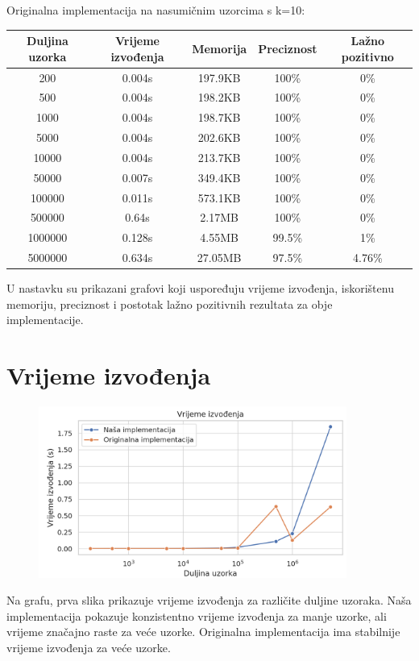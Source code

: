\documentclass[seminarskirad]{fer}
\begin{document}
Originalna implementacija na nasumičnim uzorcima s k=10:

\begin{center}
	\small
	\begin{tabular}{||c c c c c||} 
		\hline
		Duljina uzorka & Vrijeme izvođenja & Memorija & Preciznost & Lažno pozitivno \\ [0.5ex] 
		\hline\hline
		200 & 0.004s & 197.9KB & 100\% & 0\% \\ 
		\hline
		500 & 0.004s & 198.2KB & 100\% & 0\% \\
		\hline
		1000 & 0.004s & 198.7KB & 100\% & 0\% \\
		\hline
		5000 & 0.004s & 202.6KB & 100\% & 0\% \\
		\hline
		10000 & 0.004s & 213.7KB & 100\% & 0\% \\
		\hline
		50000 & 0.007s & 349.4KB & 100\% & 0\% \\ 
		\hline
		100000 & 0.011s & 573.1KB & 100\% & 0\% \\
		\hline
		500000 & 0.64s & 2.17MB & 100\% & 0\% \\
		\hline
		1000000 & 0.128s & 4.55MB & 99.5\% & 1\% \\
		\hline
		5000000 & 0.634s & 27.05MB & 97.5\% & 4.76\% \\ [1ex] 
		\hline
	\end{tabular}
\end{center}


U nastavku su prikazani grafovi koji uspoređuju vrijeme izvođenja, iskorištenu memoriju, preciznost i postotak lažno pozitivnih rezultata za obje implementacije.

\section{Vrijeme izvođenja}
\begin{figure}[h]
	\centering
	\includegraphics[width=0.9\textwidth]{images/nasumicni_rezultati_vrijeme.png}
	\label{fig:nasumicni_rezultati_vrijeme}
\end{figure}
Na grafu, prva slika prikazuje vrijeme izvođenja za različite duljine uzoraka. Naša implementacija pokazuje konzistentno vrijeme izvođenja za manje uzorke, ali vrijeme značajno raste za veće uzorke. Originalna implementacija ima stabilnije vrijeme izvođenja za veće uzorke.
\end{document}

